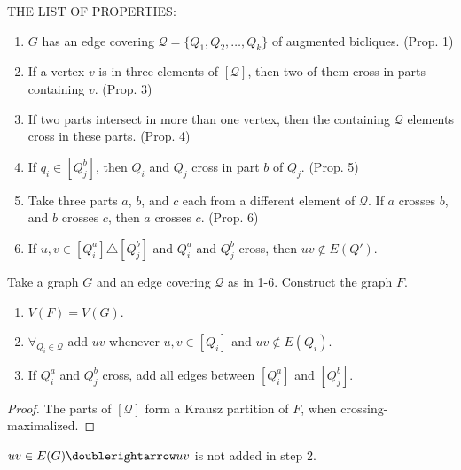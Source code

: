 


THE LIST OF PROPERTIES:

\begin{enumerate}
	\item $G$ has an edge covering $\mathcal{Q} = \{Q_1, Q_2, \ldots, Q_k\}$ of augmented bicliques. (Prop. 1)
	\item If a vertex $v$ is in three elements of $[\mathcal{Q}]$, then two of them cross in parts containing $v$. (Prop. 3)
	\item If two parts intersect in more than one vertex, then the containing $\mathcal{Q}$ elements cross in these parts. (Prop. 4)
	\item If $q_i \in [Q^b_j]$, then $Q_i$ and $Q_j$ cross in part $b$ of $Q_j$. (Prop. 5)
	\item Take three parts $a$, $b$, and $c$ each from a different element of $\mathcal{Q}$.  If $a$ crosses $b$, and $b$ crosses $c$, then $a$ crosses $c$. (Prop. 6)
	\item If $u,v \in [Q_i^a] \triangle [Q_j^b]$ and $Q_i^a$ and $Q_j^b$ cross, then $uv \notin E(Q')$.
\end{enumerate}

Take a graph $G$ and an edge covering $\mathcal{Q}$ as in 1-6.  Construct the graph $F$.
\begin{enumerate}
	\item $V(F) = V(G)$.
	\item $\forall_{Q_i \in \mathcal{Q}}$ add $uv$ whenever $u,v \in [Q_i]$ and $uv \notin E(Q_i)$.
	\item If $Q_i^a$ and $Q_j^b$ cross, add all edges between $[Q_i^a]$ and $[Q_j^b]$.
\end{enumerate}

\begin{proof}
	The parts of $[\mathcal{Q}]$ form a Krausz partition of $F$, when crossing-maximalized.  
\end{proof}

$uv \in E(G) \doublerightarrow uv$ is not added in step 2.   


